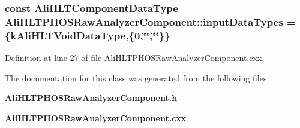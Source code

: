 \subsubsection{\setlength{\rightskip}{0pt plus 5cm}const Ali\-HLTComponent\-Data\-Type {\bf Ali\-HLTPHOSRaw\-Analyzer\-Component::input\-Data\-Types} = \{k\-Ali\-HLTVoid\-Data\-Type,\{0,\char`\"{}\char`\"{},\char`\"{}\char`\"{}\}\}\hspace{0.3cm}{\tt  [static, private]}}\label{classAliHLTPHOSRawAnalyzerComponent_AliHLTPHOSRawAnalyzerComponentv1}




Definition at line 27 of file Ali\-HLTPHOSRaw\-Analyzer\-Component.cxx.

The documentation for this class was generated from the following files:\begin{CompactItemize}
\item 
{\bf Ali\-HLTPHOSRaw\-Analyzer\-Component.h}\item 
{\bf Ali\-HLTPHOSRaw\-Analyzer\-Component.cxx}\end{CompactItemize}
